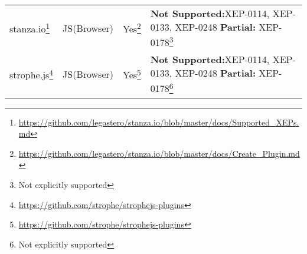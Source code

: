 \begin{tabu}{l|l l X}
    stanza.io\footnote{\url{https://github.com/legastero/stanza.io/blob/master/docs/Supported_XEPs.md}}
    & JS(Browser)
    & Yes\footnote{\url{https://github.com/legastero/stanza.io/blob/master/docs/Create_Plugin.md}}
    & \textbf{Not Supported:}\newline XEP-0114, XEP-0133, XEP-0248\newline
    \textbf{Partial:} XEP-0178\footnote{Not explicitly supported}
    \\

    strophe.js\footnote{\url{https://github.com/strophe/strophejs-plugins}}
    & JS(Browser)
    & Yes\footnote{\url{https://github.com/strophe/strophejs-plugins}}
    & \textbf{Not Supported:}\newline XEP-0114, XEP-0133, XEP-0248\newline
    \textbf{Partial:} XEP-0178\footnote{Not explicitly supported}
\end{tabu}
